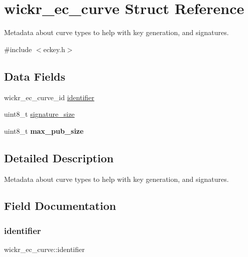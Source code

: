 \hypertarget{structwickr__ec__curve}{}\section{wickr\+\_\+ec\+\_\+curve Struct Reference}
\label{structwickr__ec__curve}


Metadata about curve types to help with key generation, and signatures.  




{\ttfamily \#include $<$eckey.\+h$>$}

\subsection*{Data Fields}
\begin{DoxyCompactItemize}
\item 
wickr\+\_\+ec\+\_\+curve\+\_\+id \mbox{\hyperlink{structwickr__ec__curve_a6a3db9bd65c2b95edec61e0b48760bf4}{identifier}}
\item 
uint8\+\_\+t \mbox{\hyperlink{structwickr__ec__curve_ab77300e816beace29e40cf8e643a5070}{signature\+\_\+size}}
\item 
\mbox{\label{structwickr__ec__curve_a9fb5d49d880efa9497699f315303092c}} 
uint8\+\_\+t {\bfseries max\+\_\+pub\+\_\+size}
\end{DoxyCompactItemize}


\subsection{Detailed Description}
Metadata about curve types to help with key generation, and signatures. 

\subsection{Field Documentation}
\mbox{\label{structwickr__ec__curve_a6a3db9bd65c2b95edec61e0b48760bf4}} 
\subsubsection{\texorpdfstring{identifier}{identifier}}
{\footnotesize\ttfamily wickr\+\_\+ec\+\_\+curve\+::identifier}

